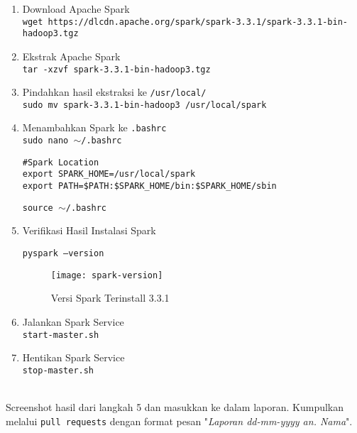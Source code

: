 \documentclass[a4paper]{tufte-handout}
\begin{document}
\begin{enumerate}
\item Download Apache Spark \\
{\tt wget https://dlcdn.apache.org/spark/spark-3.3.1/spark-3.3.1-bin-hadoop3.tgz}

\item Ekstrak Apache Spark \\
{\tt tar -xzvf spark-3.3.1-bin-hadoop3.tgz}

\item Pindahkan hasil ekstraksi ke {\tt /usr/local/} \\
{\tt sudo mv spark-3.3.1-bin-hadoop3 /usr/local/spark}

\item Menambahkan Spark ke {\tt .bashrc} \\
{\tt sudo nano $\sim$/.bashrc}
\begin{lstlisting}
#Spark Location
export SPARK_HOME=/usr/local/spark
export PATH=$PATH:$SPARK_HOME/bin:$SPARK_HOME/sbin
\end{lstlisting}
{\tt source $\sim$/.bashrc}

\item Verifikasi Hasil Instalasi Spark

{\tt pyspark --version}

\begin{figure}[!ht]
\texttt{[image: spark-version]}
\caption{Versi Spark Terinstall 3.3.1 }
\label{gam:form-ssh}
\end{figure}

\item Jalankan Spark Service \\
{\tt start-master.sh}

\item Hentikan Spark Service \\
{\tt stop-master.sh}
\end{enumerate}

 \\
Screenshot hasil dari langkah 5 dan masukkan ke dalam laporan. Kumpulkan melalui {\tt pull requests} dengan format pesan "\textit{Laporan dd-mm-yyyy an. Nama}".

\hrulefill

\clearpage
{}

\end{document}
